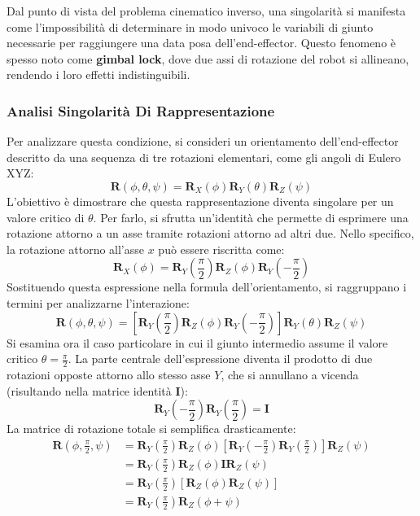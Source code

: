 \documentclass[11pt, a4paper]{report}
\begin{document}
Dal punto di vista del problema cinematico inverso, una singolarità si manifesta come l'impossibilità di determinare in modo univoco le variabili di giunto necessarie per raggiungere una data posa dell'end-effector. Questo fenomeno è spesso noto come \textbf{gimbal lock}, dove due assi di rotazione del robot si allineano, rendendo i loro effetti indistinguibili.

\subsubsection*{Analisi Singolarità Di Rappresentazione}
Per analizzare questa condizione, si consideri un orientamento dell'end-effector descritto da una sequenza di tre rotazioni elementari, come gli angoli di Eulero XYZ:
\[
    \mathbf{R}(\phi, \theta, \psi) = \mathbf{R}_{X}(\phi) \mathbf{R}_{Y}(\theta) \mathbf{R}_{Z}(\psi)
\]
L'obiettivo è dimostrare che questa rappresentazione diventa singolare per un valore critico di \(\theta\). Per farlo, si sfrutta un'identità che permette di esprimere una rotazione attorno a un asse tramite rotazioni attorno ad altri due. Nello specifico, la rotazione attorno all'asse \(x\) può essere riscritta come:
\[
    \mathbf{R}_{X}(\phi) = \mathbf{R}_{Y}\left(\frac{\pi}{2}\right) \mathbf{R}_{Z}(\phi) \mathbf{R}_{Y}\left(-\frac{\pi}{2}\right)
\]
Sostituendo questa espressione nella formula dell'orientamento, si raggruppano i termini per analizzarne l'interazione:
\[
    \mathbf{R}(\phi, \theta, \psi) = \left[ \mathbf{R}_{Y}\left(\frac{\pi}{2}\right) \mathbf{R}_{Z}(\phi) \mathbf{R}_{Y}\left(-\frac{\pi}{2}\right) \right] \mathbf{R}_{Y}(\theta) \mathbf{R}_{Z}(\psi)
\]
Si esamina ora il caso particolare in cui il giunto intermedio assume il valore critico \( \theta = \frac{\pi}{2} \). La parte centrale dell'espressione diventa il prodotto di due rotazioni opposte attorno allo stesso asse \(Y\), che si annullano a vicenda (risultando nella matrice identità \(\mathbf{I}\)):
\[
    \mathbf{R}_{Y}\left(-\frac{\pi}{2}\right) \mathbf{R}_{Y}\left(\frac{\pi}{2}\right) = \mathbf{I}
\]
La matrice di rotazione totale si semplifica drasticamente:
\begin{align*}
    \mathbf{R}\left(\phi, \frac{\pi}{2}, \psi\right) &= \mathbf{R}_{Y}\left(\frac{\pi}{2}\right) \mathbf{R}_{Z}(\phi) \left[ \mathbf{R}_{Y}\left(-\frac{\pi}{2}\right) \mathbf{R}_{Y}\left(\frac{\pi}{2}\right) \right] \mathbf{R}_{Z}(\psi) \\
    &= \mathbf{R}_{Y}\left(\frac{\pi}{2}\right) \mathbf{R}_{Z}(\phi) \mathbf{I} \mathbf{R}_{Z}(\psi) \\
    &= \mathbf{R}_{Y}\left(\frac{\pi}{2}\right) \left[ \mathbf{R}_{Z}(\phi) \mathbf{R}_{Z}(\psi) \right] \\
    &= \mathbf{R}_{Y}\left(\frac{\pi}{2}\right) \mathbf{R}_{Z}(\phi + \psi)
\end{align*}
\end{document}
